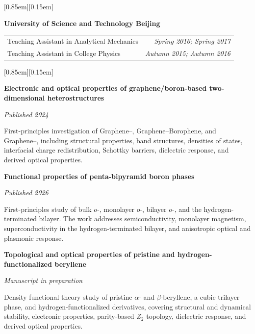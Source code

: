 \documentclass[12pt,a4paper]{article}
\newcommand{\cvtitlefont}{\ttfamily\bfseries}
\newcommand{\cvsection}[1]{%
    \vspace{1.00em}%
    \noindent
    \colorbox{subtitlecolor}{%
        \raisebox{0pt}[0.85em][0.15em]{%
            \makebox[\dimexpr\textwidth-2\fboxsep\relax][l]{%
                \textcolor{white}{\cvtitlefont\large\quad #1}%
            }%
        }%
    }%
    \par\vspace{1em}%
}
\newenvironment{cvbody}{%
    \begingroup
    \setlength{\leftskip}{1.25em}%
    \setlength{\rightskip}{0em}%
    \setlength{\parindent}{0em}%
    \setlength{\linewidth}{\dimexpr\textwidth-1.25em\relax}%
}{%
    \par\endgroup
}
\newcommand{\cvproject}[3]{%
    \textbf{#1}\par
    \hfill\textit{#2}\par
    #3\par\vspace{1em}%
}
\begin{document}
\cvsection{Teaching and Tutoring Experience}
\begin{cvbody}


\vspace{1em}
\textbf{University of Science and Technology Beijing}\par
\begin{tabularx}{\linewidth}{@{}Xr@{}}
\quad Teaching Assistant in Analytical Mechanics & \textit{Spring 2016; Spring 2017}\\
\quad Teaching Assistant in College Physics & \textit{Autumn 2015; Autumn 2016}
\end{tabularx}

\end{cvbody}

\newpage
\cvsection{Selected Research Experience}
\begin{cvbody}

\cvproject{Electronic and optical properties of graphene/boron-based two-dimensional heterostructures}{Published 2024}{First-principles investigation of Graphene--\ce{BC3}, Graphene--Borophene, and Graphene--\ce{B4C3}, including structural properties, band structures, densities of states, interfacial charge redistribution, Schottky barriers, dielectric response, and derived optical properties.}

\cvproject{Functional properties of penta-bipyramid boron phases}{Published 2026}{First-principles study of bulk $o$-\ce{B14}, monolayer $o$-\ce{B14}, bilayer $o$-\ce{B14}, and the hydrogen-terminated bilayer. The work addresses semiconductivity, monolayer magnetism, superconductivity in the hydrogen-terminated bilayer, and anisotropic optical and plasmonic response.}

\cvproject{Topological and optical properties of pristine and hydrogen-functionalized beryllene}{Manuscript in preparation}{Density functional theory study of pristine $\alpha$- and $\beta$-beryllene, a cubic trilayer phase, and hydrogen-functionalized derivatives, covering structural and dynamical stability, electronic properties, parity-based $Z_{2}$ topology, dielectric response, and derived optical properties.}

\end{cvbody}
\end{document}
